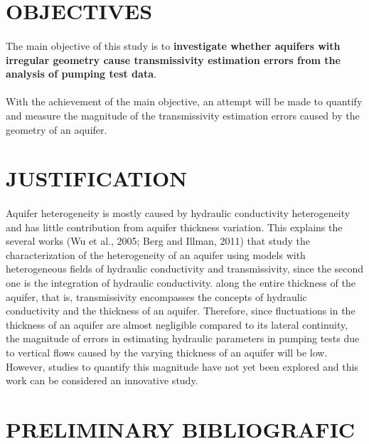 \documentclass[11pt, a4paper]{article}
\begin{document}
    \section{OBJECTIVES}
    \paragraph{} 
    The main objective of this study is to \textbf{investigate whether aquifers with irregular geometry cause transmissivity estimation errors from the analysis of pumping test data}.
    \paragraph{}
    With the achievement of the main objective, an attempt will be made to quantify and measure the magnitude of the transmissivity estimation errors caused by the geometry of an aquifer.
    
    \section{JUSTIFICATION}
    \paragraph{}
    Aquifer heterogeneity is mostly caused by hydraulic conductivity heterogeneity and has little contribution from aquifer thickness variation. This explains the several works (Wu et al., 2005; Berg and Illman, 2011) that study the characterization of the heterogeneity of an aquifer using models with heterogeneous fields of hydraulic conductivity and transmissivity, since the second one is the integration of hydraulic conductivity. along the entire thickness of the aquifer, that is, transmissivity encompasses the concepts of hydraulic conductivity and the thickness of an aquifer. Therefore, since fluctuations in the thickness of an aquifer are almost negligible compared to its lateral continuity, the magnitude of errors in estimating hydraulic parameters in pumping tests due to vertical flows caused by the varying thickness of an aquifer will be low. However, studies to quantify this magnitude have not yet been explored and this work can be considered an innovative study.
    
    \section{PRELIMINARY BIBLIOGRAFIC} 
    
\end{document}
